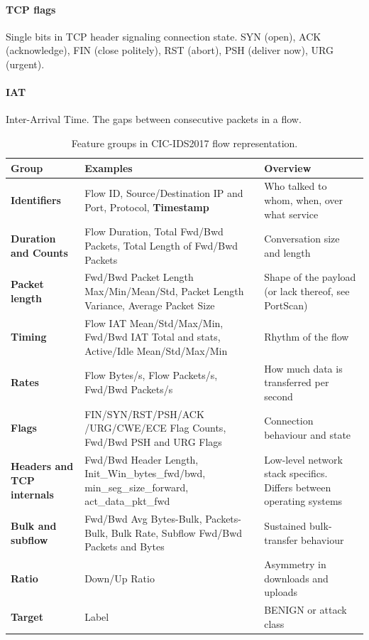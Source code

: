 \documentclass{article}
\begin{document}
\begin{appendices}
\paragraph{TCP flags} Single bits in TCP header signaling connection state. SYN (open), ACK (acknowledge), FIN (close politely), RST (abort), PSH (deliver now), URG (urgent).
\paragraph{IAT} Inter-Arrival Time. The gaps between consecutive packets in a flow.
\begin{table}[!htbp]
\centering
\footnotesize
\renewcommand{\arraystretch}{1.15}
\setlength{\tabcolsep}{4pt}
\begin{tabularx}{\textwidth}{@{}>{\raggedleft\arraybackslash}p{2.6cm} W{1.35} W{0.65}@{}}
\toprule
\textbf{Group} & \textbf{Examples} & \textbf{Overview} \\
\midrule
\textbf{Identifiers} & Flow ID, Source/Destination IP and Port, Protocol, \textbf{Timestamp} & Who talked to whom, when, over what service \\
\midrule 
\textbf{Duration and Counts} & Flow Duration, Total Fwd/Bwd Packets, Total Length of Fwd/Bwd Packets & Conversation size and length \\
\midrule 
\textbf{Packet length} & Fwd/Bwd Packet Length Max/Min/Mean/Std, Packet Length Variance, Average Packet Size & Shape of the payload (or lack thereof, see PortScan) \\
\midrule 
\textbf{Timing} & Flow IAT Mean/Std/Max/Min, Fwd/Bwd IAT Total and stats, Active/Idle Mean/Std/Max/Min & Rhythm of the flow \\
\midrule 
\textbf{Rates} & Flow Bytes/s, Flow Packets/s, Fwd/Bwd Packets/s & How much data is transferred per second \\
\midrule 
\textbf{Flags} & FIN/SYN/RST/PSH/ACK
/URG/CWE/ECE Flag Counts, Fwd/Bwd PSH and URG Flags & Connection behaviour and state \\
\midrule 
\textbf{Headers and TCP internals} & Fwd/Bwd Header Length, Init\_Win\_bytes\_fwd/bwd, min\_seg\_size\_forward, act\_data\_pkt\_fwd & Low-level network stack specifics. Differs between operating systems \\
\midrule 
\textbf{Bulk and subflow} & Fwd/Bwd Avg Bytes-Bulk, Packets-Bulk, Bulk Rate, Subflow Fwd/Bwd Packets and Bytes & Sustained bulk-transfer behaviour \\
\midrule 
\textbf{Ratio} & Down/Up Ratio & Asymmetry in downloads and uploads \\
\midrule 
\textbf{Target} & Label & BENIGN or attack class \\
\bottomrule
\end{tabularx}
\caption{Feature groups in CIC-IDS2017 flow representation.}
\end{table}

\end{appendices}
\end{document}
